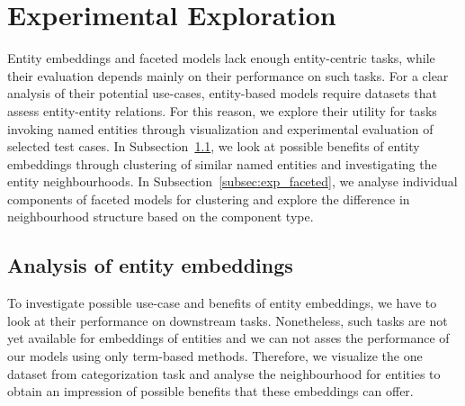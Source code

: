 \section{Experimental Exploration}\label{sec:eval_experimental}
Entity embeddings and faceted models lack enough entity-centric tasks, while their evaluation depends mainly on their performance on such tasks. For a clear analysis of their potential use-cases, entity-based models require datasets that assess entity-entity relations. For this reason, we explore their utility for tasks invoking named entities through visualization and experimental evaluation of selected test cases. In Subsection~\ref{subsec:exp_entity}, we look at possible benefits of entity embeddings through clustering of similar named entities and investigating the entity neighbourhoods. In Subsection~\ref{subsec:exp_faceted}, we analyse individual components of faceted models for clustering and explore the difference in neighbourhood structure based on the component type.
\subsection{Analysis of entity embeddings}\label{subsec:exp_entity}
To investigate possible use-case and benefits of entity embeddings, we have to look at their performance on downstream tasks. Nonetheless, such tasks are not yet available for embeddings of entities and we can not asses the performance of our models using only term-based methods. Therefore, we visualize the one dataset from categorization task and analyse the neighbourhood for entities to obtain an impression of possible benefits that these embeddings can offer. 

